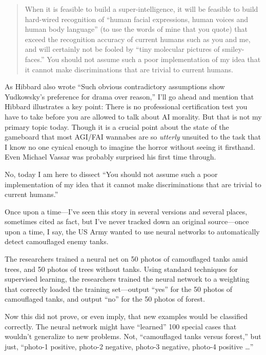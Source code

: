 \begin{quote}
{
 When it is feasible to build a super-intelligence, it will be
feasible to build hard-wired recognition of ``human
facial expressions, human voices and human body
language'' (to use the words of mine that you quote)
that exceed the recognition accuracy of current humans such as you and
me, and will certainly not be fooled by ``tiny
molecular pictures of smiley-faces.'' You should not
assume such a poor implementation of my idea that it cannot make
discriminations that are trivial to current humans.}
\end{quote}

{
 As Hibbard also wrote ``Such obvious
contradictory assumptions show Yudkowsky's preference
for drama over reason,'' I'll go
ahead and mention that Hibbard illustrates a key point: There is no
professional certification test you have to take before you are allowed
to talk about AI morality. But that is not my primary topic today.
Though it is a crucial point about the state of the gameboard that most
AGI/FAI wannabes are so \textit{utterly} unsuited to the task that I
know no one cynical enough to imagine the horror without seeing it
firsthand. Even Michael Vassar was probably surprised his first time
through.}

{
 No, today I am here to dissect ``You should not
assume such a poor implementation of my idea that it cannot make
discriminations that are trivial to current
humans.''}

{
 Once upon a time---I've seen this story in several
versions and several places, sometimes cited as fact, but
I've never tracked down an original source---once upon
a time, I say, the US Army wanted to use neural networks to
automatically detect camouflaged enemy tanks.}

{
 The researchers trained a neural net on 50 photos of camouflaged
tanks amid trees, and 50 photos of trees without tanks. Using standard
techniques for supervised learning, the researchers trained the neural
network to a weighting that correctly loaded the training set---output
``yes'' for the 50 photos of
camouflaged tanks, and output ``no''
for the 50 photos of forest.}

{
 Now this did not prove, or even imply, that new examples would be
classified correctly. The neural network might have
``learned'' 100 special cases that
wouldn't generalize to new problems. Not,
``camouflaged tanks versus forest,''
but just, ``photo-1 positive, photo-2 negative,
photo-3 negative, photo-4 positive \ldots''}

